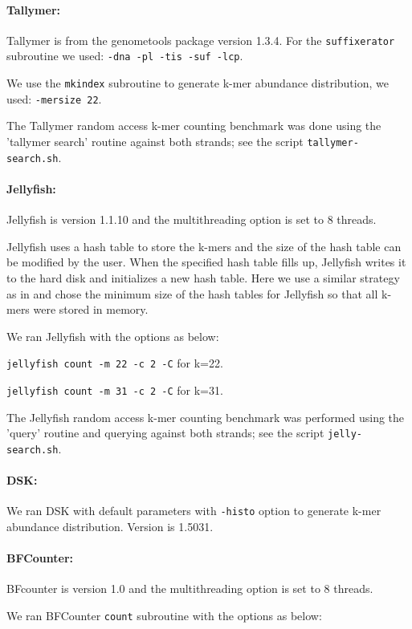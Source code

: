\documentclass[10pt]{article}
\begin{document}
\paragraph{Tallymer:}
Tallymer is from the genometools package version 1.3.4. For the {\tt suffixerator} subroutine 
we used:
{\tt -dna -pl -tis -suf -lcp}.

We use the {\tt mkindex} subroutine to generate k-mer abundance distribution, we used:
{\tt -mersize 22}.

The Tallymer random access k-mer counting benchmark was done using the
'tallymer search' routine against both strands; see the script
{\tt tallymer-search.sh}.

\paragraph{Jellyfish:}
Jellyfish is version 1.1.10 and the multithreading option is set to 8 threads.

Jellyfish uses a hash table to store the k-mers and the size of the
hash table can be modified by the user.  When the specified hash table
fills up, Jellyfish writes it to the hard
disk and initializes a new hash table.  Here we use a
similar strategy as in \cite{Melsted2011} and chose the minimum size of the hash 
tables for Jellyfish so that all k-mers were stored in memory.

We ran Jellyfish with the options as below:

{\tt jellyfish count -m 22 -c 2 -C} for k=22.

{\tt jellyfish count -m 31 -c 2 -C} for k=31.

The Jellyfish random access k-mer counting benchmark was performed
using the 'query' routine and querying against both strands; see
the script {\tt jelly-search.sh}.

\paragraph{DSK:} We ran DSK with default parameters with {\tt -histo} option to generate
k-mer abundance distribution. Version is 1.5031.

\paragraph{BFCounter:} BFcounter is version 1.0 and the multithreading option is set to 8
 threads.
 
We ran BFCounter {\tt count} subroutine with the options as below:
 
\end{document}
